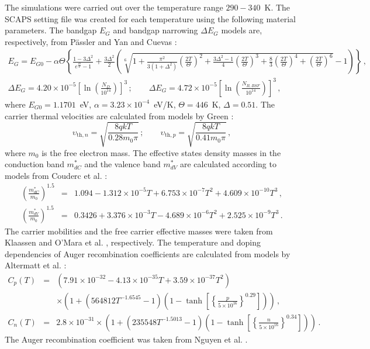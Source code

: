 \documentclass[a4paper,fleqn]{cas-sc}
\begin{document}
The simulations  were carried out over the temperature range $290-340$~K.
The SCAPS setting file was created for each temperature using the following material parameters.
The bandgap $E_G$ and bandgap narrowing $\Delta E_G$ models are, respectively, from P\"{a}ssler \citep{Pasler} and Yan and Cuevas \citep{EgNarrow}:
\begin{eqnarray}
\label{eqEg}
E_G=E_{G0}-\alpha\Theta\left\{\frac{1-3\Delta^2}{e^{\frac{\Theta}{T}}-1}
    +\frac{3\Delta^2}{2}\left(\sqrt[6]{1+\frac{\pi^2}{3(1+\Delta^2)}\left(\frac{2T}{\Theta}\right)^2
    +\frac{3\Delta^2-1}{4}\left(\frac{2T}{\Theta}\right)^3+\frac{8}{3}\left(\frac{2T}{\Theta}\right)^4
    +\left(\frac{2T}{\Theta}\right)^6}-1\right)\right\}\,,\\
\Delta E_G=4.20\times10^{-5}\left[\ln\left(\frac{N_{D}}{10^{14}}\right)\right]^3\,;\qquad
     \Delta E_G=4.72\times10^{-5}\left[\ln\left(\frac{N_{B,BSF}}{10^{14}}\right)\right]^3\,,
\end{eqnarray}
where
$E_{G0}=1.1701$~eV,
$\alpha=3.23\times10^{-4}$~eV/K,
$\Theta=446$~K,
$\Delta=0.51$.
The carrier thermal velocities are calculated from models by Green \citep{Nc:Green}:
\begin{equation}
\label{eqVth}
    \upsilon_{\mathrm{th},n}=\sqrt{\frac{8qkT}{0.28m_0\pi}}\,;\qquad
    \upsilon_{\mathrm{th},p}=\sqrt{\frac{8qkT}{0.41m_0\pi}}\,,
\end{equation}
where
$m_0$ is the free electron mass.
The effective states density masses in the conduction band $m^*_{dC}$ and
the valence band $m^*_{dV}$ are calculated according to models from Couderc et al. \citep{Si_ni_Couderc}:
\begin{eqnarray}
  \left(\frac{m^*_{dC}}{m_0}\right)^{1.5} &=& 1.094-1.312\times10^{-5}T+6.753\times10^{-7}T^2+4.609\times10^{-10}T^3\,, \\
  \left(\frac{m^*_{dV}}{m_0}\right)^{1.5} &=& 0.3426+3.376\times10^{-3}T-4.689\times10^{-6}T^2+2.525\times10^{-9}T^3\,.
\end{eqnarray}
The carrier mobilities and the free carrier effective masses  were taken from Klaassen \citep{KLAASSEN953}
and O'Mara et al. \citep{OMara}, respectively.
The temperature and doping dependencies of Auger recombination coefficients are calculated from models by Altermatt et al. \citep{Si_Auger}:
\begin{eqnarray}
   \nonumber C_{p} (T)&=& (7.91\times10^{-32}-4.13\times10^{-35}T+3.59\times10^{-37}T^2)\\
  &&\times\left(1+\left(564812T^{-1.6545}-1\right)\left(1-\tanh\left[\left\{\frac{p}{5\times10^{16}}\right\}^{0.29}\right]\right)\right)\,, \\
   C_{n} (T)&=& 2.8\times10^{-31}
  \times\left(1+\left(235548T^{-1.5013}-1\right)\left(1-\tanh\left[\left\{\frac{n}{5\times10^{16}}\right\}^{0.34}\right]\right)\right)\,.
\end{eqnarray}
The Auger recombination coefficient was taken from Nguyen et al. \citep{Si_BtB}.
\end{document}
